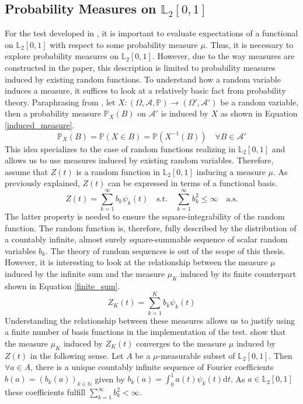 \documentclass[12pt, a4paper]{article}
\theoremstyle{MAstyle} \newtheorem{assumption}{Assumption}[section]
\theoremstyle{MAstyle} \newtheorem{definition}{Definition}[section]
\theoremstyle{MAstyle} \newtheorem{theorem}{Theorem}[section]
\begin{document}
		\subsection{Probability Measures on $\mathbb{L}_2[0,1]$}\label{prob_measures_l2}
			For the test developed in \cite{bugni_permutation_2021}, it is important to evaluate expectations of a functional on $\mathbb{L}_2[0,1]$ with respect to some probability measure $\mu$. Thus, it is necessary to explore probability measures on $\mathbb{L}_2[0,1]$. However, due to the way measures are constructed in the paper, this description is limited to probability measures induced by existing random functions. 
			To understand how a random variable induces a measure, it suffices to look at a relatively basic fact from probability theory. Paraphrasing from \cite{bauer_probability_2011}, let $X:\left(\Omega, \mathcal{A}, \mathbb{P}\right) \rightarrow \left(\Omega', \mathcal{A}'\right)$ be a random variable, then a probability measure $\mathbb{P}_X(B)$ on $\mathcal{A}'$ is induced by $X$ as shown in Equation \ref{induced_measure}.
			\begin{equation}\label{induced_measure}
				\mathbb{P}_X(B) = \mathbb{P}(X \in B) = \mathbb{P}(X^{-1}(B)) \quad \forall B \in \mathcal{A}'
			\end{equation}
			This idea specializes to the case of random functions realizing in $\mathbb{L}_2[0,1]$ and allows us to use measures induced by existing random variables.
			Therefore, assume that $Z(t)$ is a random function in $\mathbb{L}_2[0,1]$ inducing a measure $\mu$. As previously explained, $Z(t)$ can be expressed in terms of a functional basis.
			\begin{equation}
				Z(t) = \sum_{k = 1}^{\infty} b_k \psi_k(t) \quad \text{s.t.} \quad \sum_{k = 1}^{\infty} b_k^2 \leq \infty \quad \text{a.s.}
			\end{equation}
			The latter property is needed to ensure the square-integrability of the random function. The random function is, therefore, fully described by the distribution of a countably infinite, almost surely square-summable sequence of scalar random variables $b_k$. The theory of random sequences is out of the scope of this thesis. However, it is interesting to look at the relationship between the measure $\mu$ induced by the infinite sum and the measure $\mu_K$ induced by its finite counterpart shown in Equation \ref{finite_sum}.
			\begin{equation}\label{finite_sum}
				Z_K(t) = \sum_{k = 1}^{K} b_k \psi_k(t)
			\end{equation}
			Understanding the relationship between these measures allows us to justify using a finite number of basis functions in the implementation of the test.
			\cite{bugni_goodness--fit_2009} show that the measure $\mu_K$ induced by $Z_K(t)$ converges to the measure $\mu$ induced by $Z(t)$ in the following sense. Let $A$ be a $\mu$-measurable subset of $\mathbb{L}_2[0,1]$. Then $\forall a \in A$, there is a unique countably infinite sequence of Fourier coefficients $b(a) = (b_k(a))_{k \in \mathbb{N}}$ given by $b_k(a) = \int_{0}^{1} a(t) \psi_k(t) \mathrm{d}t$. As $a \in \mathbb{L}_2[0,1]$ these coefficients fulfill $\sum_{k = 1}^{\infty} b_k^2 < \infty$. \\
			
\end{document}
